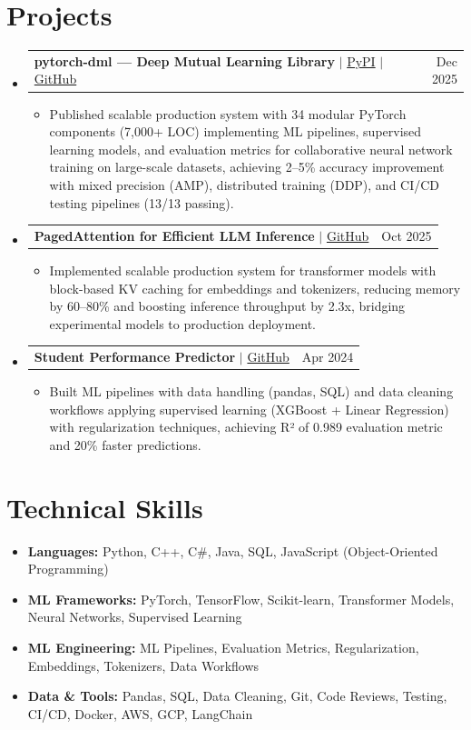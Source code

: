 \documentclass[letterpaper,11pt]{article}
\makeatletter
\newcommand{\resumeItem}[1]{\item {\small #1 \vspace{-3pt}}}
\newcommand{\resumeProjectHeading}[2]{
    \item
    \begin{tabular*}{0.97\textwidth}[t]{l@{\extracolsep{\fill}}r}
      \small #1 & #2 \\
    \end{tabular*}\vspace{-6pt}
}
\newcommand{\resumeSubHeadingListStart}{\begin{itemize}[leftmargin=0.15in, label={}]}
\newcommand{\resumeSubHeadingListEnd}{\end{itemize}}
\newcommand{\resumeItemListStart}{\begin{itemize}[leftmargin=0.25in]}
\newcommand{\resumeItemListEnd}{\end{itemize}\vspace{-5pt}}
\makeatother
\begin{document}
\section{Projects}
\resumeSubHeadingListStart

  \resumeProjectHeading
    {\textbf{pytorch-dml — Deep Mutual Learning Library} $|$ \href{https://pypi.org/project/pytorch-dml/}{PyPI} $|$ \href{https://github.com/VARUN3WARE/dml-py}{GitHub}}{Dec 2025}
    \resumeItemListStart
      \resumeItem{Published scalable production system with 34 modular PyTorch components (7,000+ LOC) implementing ML pipelines, supervised learning models, and evaluation metrics for collaborative neural network training on large-scale datasets, achieving 2–5\% accuracy improvement with mixed precision (AMP), distributed training (DDP), and CI/CD testing pipelines (13/13 passing).}
    \resumeItemListEnd

  \resumeProjectHeading
    {\textbf{PagedAttention for Efficient LLM Inference} $|$ \href{https://github.com/VARUN3WARE/Paged-Attention}{GitHub}}{Oct 2025}
    \resumeItemListStart
      \resumeItem{Implemented scalable production system for transformer models with block-based KV caching for embeddings and tokenizers, reducing memory by 60–80\% and boosting inference throughput by 2.3x, bridging experimental models to production deployment.}
    \resumeItemListEnd

  \resumeProjectHeading
    {\textbf{Student Performance Predictor} $|$ \href{https://github.com/VARUN3WARE/kaggle-Student-Performance}{GitHub}}{Apr 2024}
    \resumeItemListStart
      \resumeItem{Built ML pipelines with data handling (pandas, SQL) and data cleaning workflows applying supervised learning (XGBoost + Linear Regression) with regularization techniques, achieving R² of 0.989 evaluation metric and 20\% faster predictions.}
    \resumeItemListEnd

\resumeSubHeadingListEnd

\section{Technical Skills}
{\small
\begin{itemize}[leftmargin=0.15in, label={}]
  \item \textbf{Languages:} Python, C++, C\#, Java, SQL, JavaScript (Object-Oriented Programming)
  \item \textbf{ML Frameworks:} PyTorch, TensorFlow, Scikit-learn, Transformer Models, Neural Networks, Supervised Learning
  \item \textbf{ML Engineering:} ML Pipelines, Evaluation Metrics, Regularization, Embeddings, Tokenizers, Data Workflows
  \item \textbf{Data \& Tools:} Pandas, SQL, Data Cleaning, Git, Code Reviews, Testing, CI/CD, Docker, AWS, GCP, LangChain
\end{itemize}
}
\end{document}
